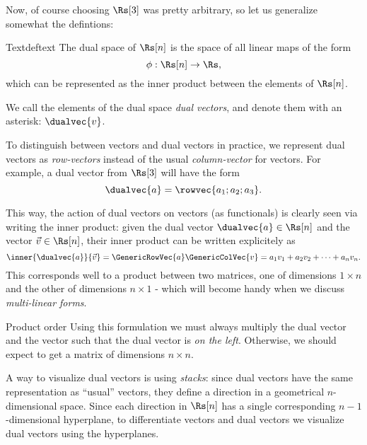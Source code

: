 Now, of course choosing $\Rs[3]$ was pretty arbitrary, so let us generalize somewhat the defintions:
\begin{definition}{Text}{deftext}
    The dual space of $\Rs[n]$ is the space of all linear maps of the form
    \begin{equation*}
        \phi:\Rs[n]\to\Rs,
    \end{equation*}
    which can be represented as the inner product between the elements of $\Rs[n]$. 

    We call the elements of the dual space \textit{dual vectors}, and denote them with an asterisk: $\dualvec{v}$.
\end{definition}

To distinguish between vectors and dual vectors in practice, we represent dual vectors as \textit{row-vectors} instead of the usual \textit{column-vector} for vectors. For example, a dual vector from $\Rs[3]$ will have the form
\begin{equation}
    \dualvec{a} = \rowvec{a_{1};a_{2};a_{3}}.
    \label{eq:dual_vectors_row_form}
\end{equation}

This way, the action of dual vectors on vectors (as functionals) is clearly seen via writing the inner product: given the dual vector $\dualvec{a}\in\Rs[n]$ and the vector $\vec{v}\in\Rs[n]$, their inner product can be written explicitely as
\begin{equation}
    \inner{\dualvec{a}}{\vec{v}} = \GenericRowVec{a} \GenericColVec{v} = a_{1}v_{1} + a_{2}v_{2} + \dots + a_{n}v_{n}.
    \label{eq:dualvec_vec_inner}
\end{equation}
This corresponds well to a product between two matrices, one of dimensions $1\times n$ and the other of dimensions $n\times1$ - which will become handy when we discuss \textit{multi-linear forms}.

\begin{note}{Product order}{}
    Using this formulation we must always multiply the dual vector and the vector such that the dual vector is \textit{on the left}. Otherwise, we should expect to get a matrix of dimensions $n\times n$.
\end{note}

A way to visualize dual vectors is using \textit{stacks}: since dual vectors have the same representation as \enquote{usual} vectors, they define a direction in a geometrical $n$-dimensional space. Since each direction in $\Rs[n]$ has a single corresponding $n-1$-dimensional hyperplane, to differentiate vectors and dual vectors we visualize dual vectors using the hyperplanes.

